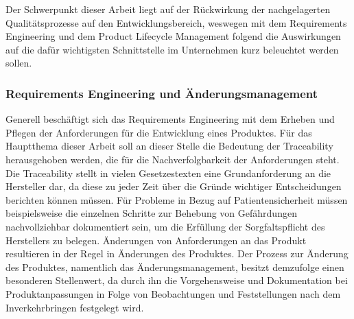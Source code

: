 \documentclass[a4paper,12pt]{report}
\begin{document}
Der Schwerpunkt dieser Arbeit liegt auf der Rückwirkung der nachgelagerten Qualitätsprozesse auf den Entwicklungsbereich, weswegen mit dem Requirements Engineering und dem Product Lifecycle Management folgend die Auswirkungen auf die dafür wichtigsten Schnittstelle im Unternehmen kurz beleuchtet werden sollen.
\subsubsection{Requirements Engineering und Änderungsmanagement}\label{subsec:RQEUndAM}
Generell beschäftigt sich das Requirements Engineering mit dem Erheben und Pflegen der Anforderungen für die Entwicklung eines Produktes. Für das Hauptthema dieser Arbeit soll an dieser Stelle die Bedeutung der Traceability herausgehoben werden, die für die Nachverfolgbarkeit der Anforderungen steht. Die Traceability stellt in vielen Gesetzestexten eine Grundanforderung an die Hersteller dar, da diese zu jeder Zeit über die Gründe wichtiger Entscheidungen berichten können müssen. Für Probleme in Bezug auf Patientensicherheit müssen beispielsweise die einzelnen Schritte zur Behebung von Gefährdungen  nachvollziehbar dokumentiert sein, um die Erfüllung der Sorgfaltspflicht des Herstellers zu belegen. Änderungen von Anforderungen an das Produkt resultieren in der Regel in Änderungen des Produktes. Der Prozess zur Änderung des Produktes, namentlich das Änderungsmanagement, besitzt demzufolge einen besonderen Stellenwert, da durch ihn die Vorgehensweise und Dokumentation bei Produktanpassungen in Folge von Beobachtungen und Feststellungen nach dem Inverkehrbringen festgelegt wird.
\end{document}
